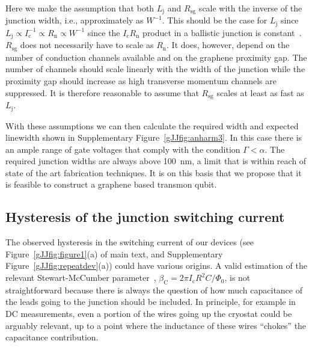 Here we make the assumption that both $L_\text{j}$ and $R_\text{sg}$ scale with the inverse of the junction width, i.e., approximately as $W^{-1}$.
This should be the case for $L_\text{j}$ since $L_\text{j} \propto I_\text{c}^{-1} \propto R_\text{n} \propto W^{-1}$ since the $I_\text{c}R_\text{n}$ product in a ballistic junction is constant~\cite{titovJosephsonEffectBallistic2006b}.
$R_\text{sg}$ does not necessarily have to scale as $R_\text{n}$.
It does, however, depend on the number of conduction channels available and on the graphene proximity gap.
The number of channels should scale linearly with the width of the junction while the proximity gap should increase as high transverse momentum channels are suppressed.
It is therefore reasonable to assume that $R_\text{sg}$ scales at least as fast as $L_\text{j}$.

With these assumptions we can then calculate the required width and expected linewidth shown in Supplementary Figure~\ref{gJJfig:anharm3}.
In this case there is an ample range of gate voltages that comply with the condition $\Gamma<\alpha$.
The required junction widths are always above \SI{100}{\nano\meter}, a limit that is within reach of state of the art fabrication techniques.
It is on this basis that we propose that it is feasible to construct a graphene based transmon qubit.




\subsection{Hysteresis of the junction switching current}\label{sec:hysteresis}
\noindent The observed hysteresis in the switching current of our devices (see Figure~\ref{gJJfig:figure1}(a) of main text, and Supplementary Figure~\ref{gJJfig:repeatdev}(a)) could have various origins.
A valid estimation of the relevant Stewart-McCumber parameter~\cite{tinkhamIntroductionSuperconductivity1996}, $\beta_\text{C}=2\pi I_\text{c}R^2C/\Phi_0$, is not straightforward because there is always the question of how much capacitance of the leads going to the junction should be included.
In principle, for example in DC measurements, even a portion of the wires going up the cryostat could be arguably relevant, up to a point where the inductance of these wires ``chokes'' the capacitance contribution.

